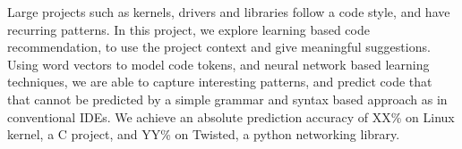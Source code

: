 Large projects such as kernels, drivers and libraries follow a code
style, and have recurring patterns. In this project, we explore learning based
code recommendation, to use the project context and give meaningful
suggestions.
Using word vectors to model code tokens, and neural network based learning
techniques, we are able to capture interesting patterns, and predict code that
that cannot be predicted by a simple grammar and syntax based approach as in
conventional IDEs.
We achieve an absolute prediction accuracy of XX\% on Linux kernel, a C
project, and YY\% on Twisted, a python networking library.
